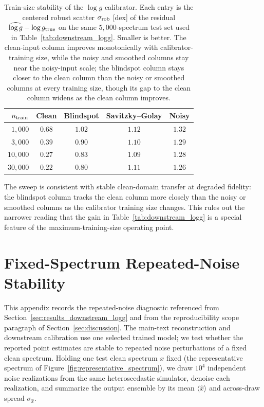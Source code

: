 \documentclass[twocolumn]{aastex7}
\begin{document}
\begin{table}
\centering
\begin{tabular}{rcccc}
\hline
$n_{\rm train}$ & Clean & Blindspot & Savitzky--Golay & Noisy \\
\hline
$1{,}000$  & $0.68$ & $1.02$ & $1.12$ & $1.32$ \\
$3{,}000$  & $0.39$ & $0.90$ & $1.10$ & $1.29$ \\
$10{,}000$ & $0.27$ & $0.83$ & $1.09$ & $1.28$ \\
$30{,}000$ & $0.22$ & $0.80$ & $1.11$ & $1.26$ \\
\hline
\end{tabular}
\caption{Train-size stability of the $\log g$ calibrator. Each entry is the centered robust scatter $\sigma_{\rm rob}$ [dex] of the residual $\widehat{\log g}-\log g_{\rm true}$ on the same $5{,}000$-spectrum test set used in Table~\ref{tab:downstream_logg}. Smaller is better. The clean-input column improves monotonically with calibrator-training size, while the noisy and smoothed columns stay near the noisy-input scale; the blindspot column stays closer to the clean column than the noisy or smoothed columns at every training size, though its gap to the clean column widens as the clean column improves.}
\label{tab:downstream_logg_sweep}
\end{table}

The sweep is consistent with stable clean-domain transfer at degraded fidelity: the blindspot column tracks the clean column more closely than the noisy or smoothed columns as the calibrator training size changes. This rules out the narrower reading that the gain in Table~\ref{tab:downstream_logg} is a special feature of the maximum-training-size operating point.

\section{Fixed-Spectrum Repeated-Noise Stability}
\label{app:noise_stability}

This appendix records the repeated-noise diagnostic referenced from Section~\ref{sec:results_downstream_logg} and from the reproducibility scope paragraph of Section~\ref{sec:discussion}. The main-text reconstruction and downstream calibration use one selected trained model; we test whether the reported point estimates are stable to repeated noise perturbations of a fixed clean spectrum. Holding one test clean spectrum $x$ fixed (the representative spectrum of Figure~\ref{fig:representative_spectrum}), we draw $10^{4}$ independent noise realizations from the same heteroscedastic simulator, denoise each realization, and summarize the output ensemble by its mean $\langle\hat{x}\rangle$ and across-draw spread $\sigma_{\hat{x}}$.
\end{document}
